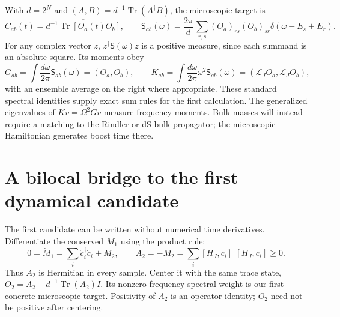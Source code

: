\documentclass[11pt,a4paper]{article}
\newcommand{\Tr}{\operatorname{Tr}}
\begin{document}
With $d=2^N$ and $(A,B)=d^{-1}\Tr(A^\dagger B)$, the microscopic
target is
\begin{equation}
 C_{ab}(t)=\overline{d^{-1}\Tr[O_a(t)O_b]},\qquad
 \mathsf S_{ab}(\omega)=\frac{2\pi}{d}\,
 \overline{\sum_{r,s}(O_a)_{rs}(O_b)_{sr}
 \delta(\omega-E_s+E_r)}.\label{spectral}
\end{equation}
For any complex vector $z$, $z^\dagger\mathsf S(\omega)z$ is a positive
measure, since each summand is an absolute square. Its moments obey
\begin{equation}
 G_{ab}=\int\frac{d\omega}{2\pi}\mathsf S_{ab}(\omega)=(O_a,O_b),
 \qquad
 K_{ab}=\int\frac{d\omega}{2\pi}\omega^2\mathsf S_{ab}(\omega)
       =(\mathcal L_J O_a,\mathcal L_J O_b),
\end{equation}
with an ensemble average on the right where appropriate. These standard
spectral identities supply exact sum rules for the first calculation.
The generalized eigenvalues of $Kv=\Omega^2Gv$ measure frequency moments.
Bulk masses will instead require a matching to the Rindler or dS bulk
propagator; the microscopic Hamiltonian generates boost time there.

\newpage
\section{A bilocal bridge to the first dynamical candidate}
The first candidate can be written without numerical time derivatives.
Differentiate the conserved $M_1$ using the product rule:
\begin{equation}
 0=\dot M_1=\sum_i\dot c_i^\dagger\dot c_i+M_2,
 \qquad
 A_2=-M_2=\sum_i[H_J,c_i]^\dagger[H_J,c_i]\geq0.\label{a2}
\end{equation}
Thus $A_2$ is Hermitian in every sample. Center it with the same trace
state, $O_2=A_2-d^{-1}\Tr(A_2)I$. Its nonzero-frequency spectral
weight is our first concrete microscopic target. Positivity of $A_2$
is an operator identity; $O_2$ need not be positive after centering.
\end{document}
